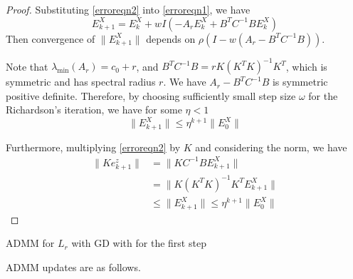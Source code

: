 \begin{proof}
Substituting \eqref{erroreqn2} into \eqref{erroreqn1}, we have 
\begin{equation}
    E^X_{k+1} = E^X_{k} + wI\left( -A_rE^X_{k} + B^T C^{-1} B E^X_{k} \right)
\end{equation}
Then convergence of $\|E^X_{k+1} \|$ depends on $\rho(I  - w ( A_r - B^T C^{-1}B) )$. 

Note that $\lambda_{\text{min}}(A_r) = c_0 + r$, and $B^T C^{-1} B = r K (K^TK)^{-1} K^T$, which is symmetric and has spectral radius $r$. We have $A_r - B^T C^{-1} B$ is symmetric positive definite. Therefore, by choosing sufficiently small step size $\omega$ for the Richardson's iteration, we have for some $\eta < 1$
\begin{equation}
    \|E^X_{k+1}\| \leq \eta^{k+1} \|E^X_{0} \| 
\end{equation}

Furthermore, multiplying \eqref{erroreqn2} by $K$ and considering the norm, we have 
\begin{equation}
    \begin{aligned}
       \|Ke^z_{k+1} \| &= \|KC^{-1}B E^X_{k+1}\| \\
        & = \| K(K^T K)^{-1} K^T  E^X_{k+1}\| \\
        & \leq \|E^X_{k+1}\|  \leq \eta^{k+1} \|E^X_{0} \| 
    \end{aligned}
\end{equation}
\end{proof}




\begin{algorithm}\label{alg:inexactADMM2}
\caption{ADMM for $L_r$ with GD with for the first step}
ADMM updates are as follows. 
\begin{algorithmic}
\EndFor
\end{algorithmic}
\end{algorithm}



